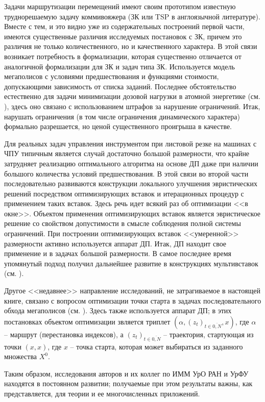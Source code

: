 \documentclass[11pt,twoside]{report}
\begin{document}
{{Задачи маршрутизации перемещений имеют своим прототипом известную труднорешаемую задачу коммивояжера (ЗК или TSP в англоязычной литературе). Вместе с тем, и это видно уже из содержательных построений первой части, имеются существенные различия исследуемых постановок с ЗК, причем это различия не только количественного, но и качественного характера. В этой связи возникает потребность в формализации, которая существенно отличается от аналогичной формализации для ЗК и задач типа ЗК. Используется модель мегаполисов с условиями предшествования и функциями стоимости, допускающими зависимость от списка заданий. Последнее обстоятельство естественно для задачи минимизации дозовой нагрузки в атомной энергетике (см. \cite{Cha2`}), здесь оно связано с использованием штрафов за нарушение ограничений. Итак, нарушать ограничения (в том числе ограничения динамического характера) формально разрешается, но ценой существенного проигрыша в качестве.

Для реальных задач управления инструментом при листовой резке на машинах с ЧПУ типичным является случай достаточно большой размерности, что крайне затрудняет реализацию оптимального алгоритма на основе ДП даже при наличии большого количества условий предшествования. В этой связи во второй части последовательно развиваются конструкции локального улучшения эвристических решений посредством оптимизирующих вставок и итерационных процедур с применением таких вставок. Здесь речь идет всякий раз об оптимизации <<в окне>>. Объектом применения оптимизирующих вставок является эвристическое решение со свойством допустимости в смысле соблюдения полной системы ограничений. При построении оптимизирующих вставок <<умеренной>> размерности активно используется аппарат ДП. Итак, ДП находит свое применение и в задачах большой размерности. В самое последнее время упомянутый подход получил дальнейшее развитие в конструкциях мультивставок (см. \cite{ChenGrig, ChenChenGrig}).

Другое <<недавнее>> направление исследований, не затрагиваемое в настоящей книге, связано с вопросом оптимизации точки старта в задачах последовательного обхода мегаполисов (см. \cite{StartPoint,StartFinishPoint,ChenChen}). Здесь также используется аппарат ДП; в этих постановках объектом оптимизации звляется триплет $(\alpha,(z_t)_{t\in \overline{0,N}},x)$, где $\alpha$ -- маршрут (перестановка индексов), а $(z_t)_{t\in \overline{0,N}}$ -- траектория, стартующая из точки $(x,x)$, где $x$ -- точка старта, которая может выбираться из заданного множества $X^0$.

Таким образом, исследования авторов и их коллег по ИММ УрО РАН и УрФУ находятся в постоянном развитии; получаемые при этом результаты важны, как представляется, для теории и ее многочисленных приложений.











}}
\end{document}
